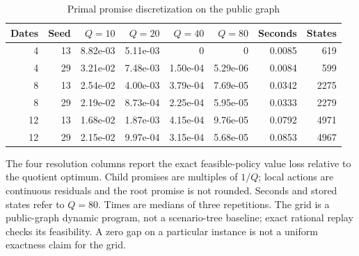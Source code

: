 \begin{table}[p]
\centering\small
\caption{Primal promise discretization on the public graph}\label{tab:grid}
\begin{tabular}{rrrrrrrr}
\toprule
Dates & Seed & $Q=10$ & $Q=20$ & $Q=40$ & $Q=80$ & Seconds & States \\
\midrule
4 & 13 & 8.82e-03 & 5.11e-03 & 0 & 0 & 0.0085 & 619 \\
4 & 29 & 3.21e-02 & 7.48e-03 & 1.50e-04 & 5.29e-06 & 0.0084 & 599 \\
8 & 13 & 2.54e-02 & 4.00e-03 & 3.79e-04 & 7.69e-05 & 0.0342 & 2275 \\
8 & 29 & 2.19e-02 & 8.73e-04 & 2.25e-04 & 5.95e-05 & 0.0333 & 2279 \\
12 & 13 & 1.68e-02 & 1.87e-03 & 4.15e-04 & 9.76e-05 & 0.0792 & 4971 \\
12 & 29 & 2.15e-02 & 9.97e-04 & 3.15e-04 & 5.68e-05 & 0.0853 & 4967 \\
\bottomrule
\end{tabular}
\par\smallskip\begin{minipage}{\textwidth}\footnotesize The four resolution columns report the exact feasible-policy value loss relative to the quotient optimum. Child promises are multiples of $1/Q$; local actions are continuous residuals and the root promise is not rounded. Seconds and stored states refer to $Q=80$. Times are medians of three repetitions. The grid is a public-graph dynamic program, not a scenario-tree baseline; exact rational replay checks its feasibility. A zero gap on a particular instance is not a uniform exactness claim for the grid.\end{minipage}
\end{table}
